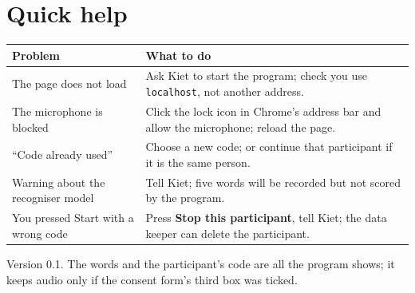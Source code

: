 \documentclass[11pt,a4paper]{article}
\begin{document}
\section{Quick help}
\begin{tabularx}{\linewidth}{>{\raggedright\arraybackslash}p{4.6cm}>{\raggedright\arraybackslash}X}
\toprule \textbf{Problem} & \textbf{What to do}\\ \midrule
The page does not load & Ask Kiet to start the program; check you use \texttt{localhost}, not another address.\\
The microphone is blocked & Click the lock icon in Chrome's address bar and allow the microphone; reload the page.\\
``Code already used'' & Choose a new code; or continue that participant if it is the same person.\\
Warning about the recogniser model & Tell Kiet; five words will be recorded but not scored by the program.\\
You pressed Start with a wrong code & Press \textbf{Stop this participant}, tell Kiet; the data keeper can delete the participant.\\
\bottomrule\end{tabularx}
\vfill {\footnotesize Version 0.1. The words and the participant's code are all the program shows; it keeps audio only if the consent form's third box was ticked.}
\end{document}
